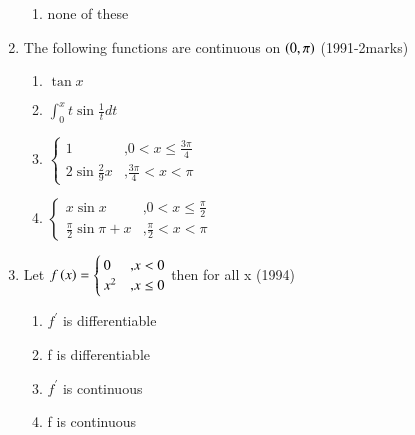 \documentclass[journal]{IEEEtran}
\numberwithin{equation}{enumi}
\numberwithin{figure}{enumi}
\begin{document}
\begin{enumerate}
\begin{enumerate}
				\item none of these 
			\end{enumerate}
		\item The following functions are continuous on $\left(0,\pi\right)$ \hfill{(1991-2marks)}
			\begin{enumerate}
				\item $\tan{x}$
				\item $\int_{0}^{x}t\sin{\frac{1}{t}}dt$ 
				\item $\begin{cases} 1 & \text{,} 0<x\leq\frac{3\pi}{4} \\
				2\sin{\frac{2}{9}x} & \text{,} \frac{3\pi}{4}<x<\pi \end{cases}$
			\item $\begin{cases} x\sin{x} & \text{,} 0<x\leq\frac{\pi}{2} \\ \frac{\pi}{2}\sin{\pi+x} & \text{,} \frac{\pi}{2}<x<\pi \end{cases}$
			\end{enumerate}
		\item Let $f\left(x\right)=\begin{cases} 0 & \text{,} x<0 \\
                             x^2 & \text{,} x\leq0 \end{cases}$ then for all x \hfill{(1994)}
			     \begin{enumerate}
				     \item $f^{\prime}$ is differentiable
				     \item f is differentiable
				     \item $f^{\prime}$ is continuous
				     \item f is continuous
			     \end{enumerate}


\end{enumerate}
\end{document}
